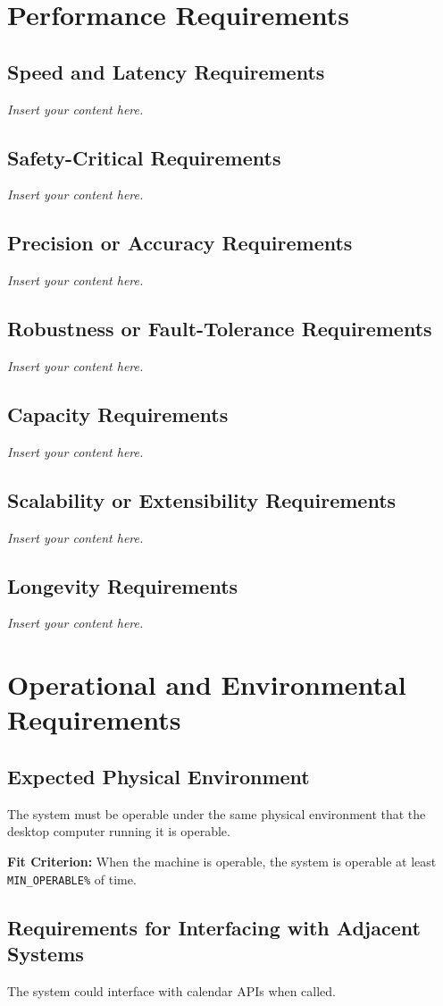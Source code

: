 \documentclass[12pt]{article}
\newcommand{\lips}{\textit{Insert your content here.}}
\begin{document}
\section{Performance Requirements}
\subsection{Speed and Latency Requirements}
\lips
\subsection{Safety-Critical Requirements}
\lips
\subsection{Precision or Accuracy Requirements}
\lips
\subsection{Robustness or Fault-Tolerance Requirements}
\lips
\subsection{Capacity Requirements}
\lips
\subsection{Scalability or Extensibility Requirements}
\lips
\subsection{Longevity Requirements}
\lips

\section{Operational and Environmental Requirements}
\subsection{Expected Physical Environment}
The system must be operable under the same physical environment that the desktop computer running it is operable.

\textbf{Fit Criterion:} When the machine is operable, the system is operable at least \texttt{MIN\_OPERABLE\%} of time.

\subsection{Requirements for Interfacing with Adjacent Systems}
The system could interface with calendar APIs when called.
\end{document}
